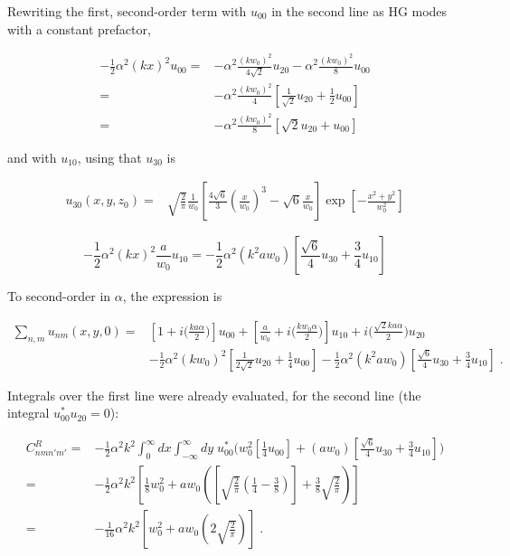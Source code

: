\documentclass[aps,twoside,secnumarabic,balancelastpage,amsmath,amssymb,nofootinbib,hyperref=pdftex]{revtex4}
\newcommand{\bigfrac}[2]{\Big( \frac{#1}{#2}\Big)}
\begin{document}
Rewriting the first, second-order term with $u_{00}$ in the second line as HG modes with a constant prefactor, 

\begin{align*}
	-\frac{1}{2}\alpha^2 (kx)^2 u_{00} = &
	-\alpha^2 \frac{ (k w_0)^2} {4 \sqrt{2}} u_{20}
	-\alpha^2 \frac{(kw_0)^2}{8} u_{00}
	\\ = &
	-\alpha^2  \frac{(k w_0)^2 }{4}
		[ \frac{1}{ \sqrt{2}} u_{20}
		+
		\frac{1}{2} u_{00}
		]
			\\ = &
	-\alpha^2  \frac{ (k w_0)^2 }{8}
		[  \sqrt{2} u_{20}
		+
		 u_{00}
		]
\end{align*}

and with $u_{10}$, using that $u_{30}$ is

\begin{align*}
u_{30} (x,y,z_0) = &
 \sqrt{\frac{2}{\pi}}
 \frac{1}{w_0}
 [
 \frac{4 \sqrt{6}}{3} (\frac{x}{w_0})^3
 -
 \sqrt{6} \frac{x}{w_0}
 ]
 \exp
 [
 -\frac{x^2+y^2}{w_0^2}
 ]
\end{align*}



\begin{equation*}
	- \frac{1}{2}\alpha^2 (kx)^2 \frac{a}{w_0}u_{10} = 
	-\frac{1}{2}\alpha^2  (k^2 a w_0)
	[	
	 \frac{ \sqrt{6}} {4} u_{30}
	+ \frac{3}{4} u_{10}
	]
\end{equation*}

To second-order in $\alpha$, the expression is

	\begin{align*}
		\sum_{n,m} u_{nm}(x,y,0)=&
			\left[
				1+
				i \bigfrac{ k a \alpha}{ 2}
			\right]
			u_{00}
			+
			\left[
			\frac{a}{w_{0}}		
			+
			i  \bigfrac{k w_{0} \alpha}{2}	
			\right]			
			u_{10}
			+
			i  
				\bigfrac{\sqrt{2} k a \alpha}{ 2}
			u_{20}
			\\  &
	- \frac{1}{2}\alpha^2  (k w_0)^2 
		[ \frac{1}{2 \sqrt{2}} u_{20}
		+
		\frac{1}{4} u_{00}
		]	
		-\frac{1}{2}
		\alpha^2  (k^2 a w_0)
	[	
	 \frac{ \sqrt{6}} {4} u_{30}
	+ \frac{3}{4} u_{10}
	]
				 \; .
	\end{align*}

Integrals over the first line were already evaluated, for the second line (the integral $u_{00}^* u_{20} =0$):

\begin{align*}
C_{nmn'm'}^{R} =& 
-\frac{1}{2}
\alpha^2 k^2
\int_{0}^{\infty} dx\int_{-\infty}^{\infty}  dy \;
u_{00}^* \big(
	  w_0^2 
		[
		\frac{1}{4} u_{00}
		]	
		+ ( a w_0)
	[	
	 \frac{ \sqrt{6}} {4} u_{30}
	+ \frac{3}{4} u_{10}
	]
	\big)
	\\ =&
	-\frac{1}{2}\alpha^2 k^2 
	[
	 \frac{1}{8} w_0^2
	+ 
	a w_0(
	[
	\sqrt{\frac{2}{\pi}}
		(
		\frac{1}{4}
		-
		\frac{3}{8}
		)
	]
	+
	\frac{3}{8}
	\sqrt{\frac{2}{\pi}}
	)
	]
		\\ =&
	-\frac{1}{16}\alpha^2 k^2 
	[
	 w_0^2
	+ 
	a w_0(
	2
	\sqrt{\frac{2}{\pi}}
	)
	]
				 \; .
\end{align*}
\end{document}

